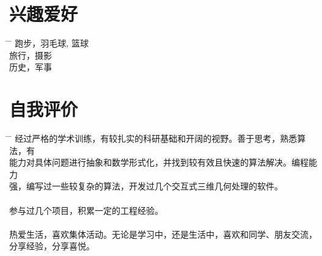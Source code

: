 \documentclass[20pt]{article} %
\begin{document}

\section{兴趣爱好}
\begin{tabbing}%
\hspace{5mm} \= \hspace{14cm} \= \kill %
\sqbullet \> {跑步，羽毛球, 篮球} \\%
\sqbullet \> {旅行，摄影}\\
\sqbullet \> {历史，军事}
\end{tabbing}%

\section{自我评价}

\begin{tabbing}%
\hspace{5mm} \= \hspace{14cm} \= \kill %
\sqbullet \> {经过严格的学术训练，有较扎实的科研基础和开阔的视野。善于思考，熟悉算法，有}\\
\> {能力对具体问题进行抽象和数学形式化，并找到较有效且快速的算法解决。编程能力}\\
\> {强，编写过一些较复杂的算法，开发过几个交互式三维几何处理的软件。} \\%
\\
\sqbullet \> {参与过几个项目，积累一定的工程经验。}\\
\\
\sqbullet \> {热爱生活，喜欢集体活动。无论是学习中，还是生活中，喜欢和同学、朋友交流，}\\
\> {分享经验，分享喜悦。}
\end{tabbing}%




\end{document}
